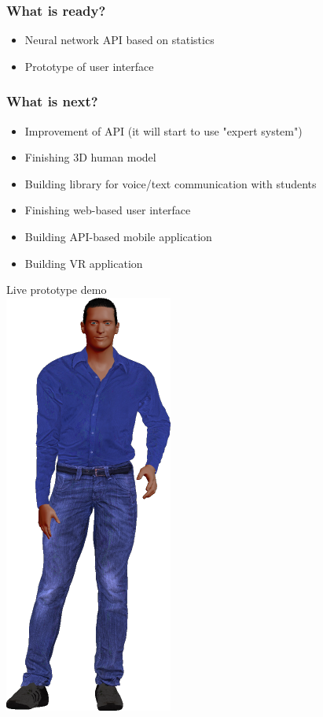 \documentclass[12pt]{beamer}
\begin{document}
	\begin{frame}
		\frametitle{What is ready?}
		\begin{itemize}
			\item Neural network API based on statistics
			\item Prototype of user interface
		\end{itemize}
	\end{frame}
	\begin{frame}
		\frametitle{What is next?}
		\begin{itemize}
			\item Improvement of API (it will start to use "expert system") 
			\item Finishing 3D human model
			\item Building library for voice/text communication with students
			\item Finishing web-based user interface
			\item Building API-based mobile application
			\item Building VR application
		\end{itemize}
	\end{frame}
	\begin{frame}
		\begin{center}
			{\Huge Live prototype demo} \\ \vspace{1cm}
			\includegraphics[scale=0.25]{bad_boy.png}
		\end{center}
	\end{frame}
\end{document}
